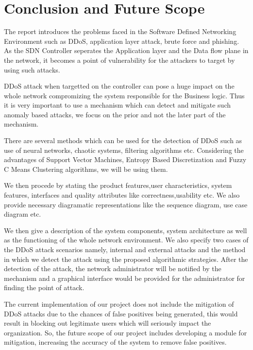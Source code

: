 \documentclass[12pt,a4paper,final]{report}
\begin{document}
\chapter{Conclusion and Future Scope}
\thispagestyle{empty}
\newpage
The report introduces the problems faced in the Software Defined Networking Environment such as DDoS,
application layer attack, brute force and phishing. As the SDN Controller seperates the Application layer and 
the Data flow plane in the network, it becomes a point of vulnerability for the attackers to target by using 
such attacks.

DDoS attack when targetted on the controller can pose a huge impact on the whole network compromizing the system 
responsible for the Business logic. Thus it is very important to use a mechanism which can detect and mitigate such 
anomaly based attacks, we focus on the prior and not the later part of the mechanism.

There are several methods which can be used for the detection of DDoS such as use of neural networks, chaotic 
systems, filtering algorithms etc. Considering the advantages of Support Vector Machines, Entropy Based Discretization and Fuzzy C Means Clustering algorithms, we will be using them.

We then procede by stating the product features,user characteristics, system features, interfaces and quality 
attributes like correctness,usability etc. We also provide necessary diagramatic representations like the 
sequence diagram, use case diagram etc.

We then give a description of the system components, system architecture as well as the functioning of the whole
network environment. We also specify two cases of the DDoS attack scenarios namely, internal and external attacks and the method in which we detect the attack using the proposed algorithmic strategies. After the detection of the attack, the network administrator will be notified by the mechanism and a graphical interface would be provided for the administrator for finding the point of attack.


The current implementation of our project does not include the mitigation of DDoS attacks due to the chances of false positives being generated, this would  result in blocking out legitimate users which will seriously impact the organization. So, the future scope of our project includes developing a module for mitigation, increasing the accuracy of the system to remove false positives.
\end{document}
